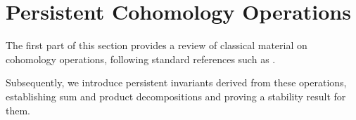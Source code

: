 
\section{Persistent Cohomology Operations}\label{s:steenrod}

The first part of this section provides a review of classical material on cohomology operations, following standard references such as \cite{steenrod1962cohomology, mosheroperations1968, may1970general}.

Subsequently, we introduce persistent invariants derived from these operations, establishing sum and product decompositions and proving a stability result for them.




